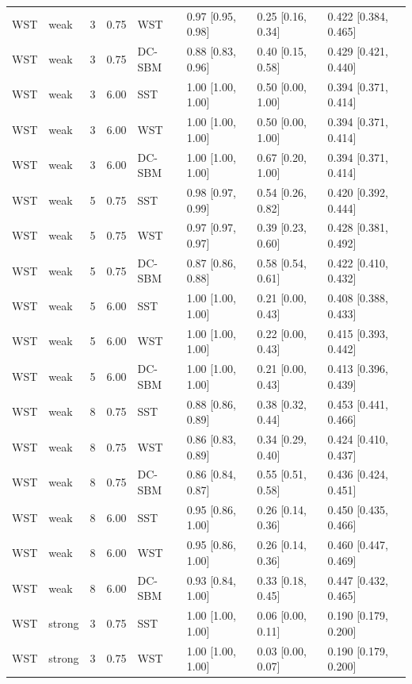 \begin{table}
\begin{tabular}[t]{llrrllll}
\addlinespace
WST & weak & 3 & 0.75 & WST & 0.97 [0.95, 0.98] & 0.25 [0.16, 0.34] & 0.422 [0.384, 0.465]\\
WST & weak & 3 & 0.75 & DC-SBM & 0.88 [0.83, 0.96] & 0.40 [0.15, 0.58] & 0.429 [0.421, 0.440]\\
WST & weak & 3 & 6.00 & SST & 1.00 [1.00, 1.00] & 0.50 [0.00, 1.00] & 0.394 [0.371, 0.414]\\
WST & weak & 3 & 6.00 & WST & 1.00 [1.00, 1.00] & 0.50 [0.00, 1.00] & 0.394 [0.371, 0.414]\\
WST & weak & 3 & 6.00 & DC-SBM & 1.00 [1.00, 1.00] & 0.67 [0.20, 1.00] & 0.394 [0.371, 0.414]\\
\addlinespace
WST & weak & 5 & 0.75 & SST & 0.98 [0.97, 0.99] & 0.54 [0.26, 0.82] & 0.420 [0.392, 0.444]\\
WST & weak & 5 & 0.75 & WST & 0.97 [0.97, 0.97] & 0.39 [0.23, 0.60] & 0.428 [0.381, 0.492]\\
WST & weak & 5 & 0.75 & DC-SBM & 0.87 [0.86, 0.88] & 0.58 [0.54, 0.61] & 0.422 [0.410, 0.432]\\
WST & weak & 5 & 6.00 & SST & 1.00 [1.00, 1.00] & 0.21 [0.00, 0.43] & 0.408 [0.388, 0.433]\\
WST & weak & 5 & 6.00 & WST & 1.00 [1.00, 1.00] & 0.22 [0.00, 0.43] & 0.415 [0.393, 0.442]\\
\addlinespace
WST & weak & 5 & 6.00 & DC-SBM & 1.00 [1.00, 1.00] & 0.21 [0.00, 0.43] & 0.413 [0.396, 0.439]\\
WST & weak & 8 & 0.75 & SST & 0.88 [0.86, 0.89] & 0.38 [0.32, 0.44] & 0.453 [0.441, 0.466]\\
WST & weak & 8 & 0.75 & WST & 0.86 [0.83, 0.89] & 0.34 [0.29, 0.40] & 0.424 [0.410, 0.437]\\
WST & weak & 8 & 0.75 & DC-SBM & 0.86 [0.84, 0.87] & 0.55 [0.51, 0.58] & 0.436 [0.424, 0.451]\\
WST & weak & 8 & 6.00 & SST & 0.95 [0.86, 1.00] & 0.26 [0.14, 0.36] & 0.450 [0.435, 0.466]\\
\addlinespace
WST & weak & 8 & 6.00 & WST & 0.95 [0.86, 1.00] & 0.26 [0.14, 0.36] & 0.460 [0.447, 0.469]\\
WST & weak & 8 & 6.00 & DC-SBM & 0.93 [0.84, 1.00] & 0.33 [0.18, 0.45] & 0.447 [0.432, 0.465]\\
WST & strong & 3 & 0.75 & SST & 1.00 [1.00, 1.00] & 0.06 [0.00, 0.11] & 0.190 [0.179, 0.200]\\
WST & strong & 3 & 0.75 & WST & 1.00 [1.00, 1.00] & 0.03 [0.00, 0.07] & 0.190 [0.179, 0.200]\\

\end{tabular}
\end{table}
